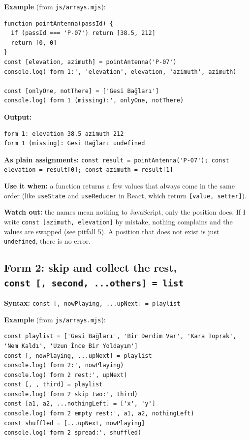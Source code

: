 \textbf{Example} (from \passthrough{\lstinline!js/arrays.mjs!}):

\begin{lstlisting}
function pointAntenna(passId) {
  if (passId === 'P-07') return [38.5, 212]
  return [0, 0]
}
const [elevation, azimuth] = pointAntenna('P-07')
console.log('form 1:', 'elevation', elevation, 'azimuth', azimuth)

const [onlyOne, notThere] = ['Gesi Bağları']
console.log('form 1 (missing):', onlyOne, notThere)
\end{lstlisting}

\textbf{Output:}

\begin{lstlisting}
form 1: elevation 38.5 azimuth 212
form 1 (missing): Gesi Bağları undefined
\end{lstlisting}

\textbf{As plain assignments:} \passthrough{\lstinline!const result = pointAntenna('P-07'); const elevation = result[0]; const azimuth = result[1]!}

\textbf{Use it when:} a function returns a few values that always come in the same order (like \passthrough{\lstinline!useState!} and \passthrough{\lstinline!useReducer!} in React, which return \passthrough{\lstinline![value, setter]!}).

\textbf{Watch out:} the names mean nothing to JavaScript, only the position does. If I write \passthrough{\lstinline!const [azimuth, elevation]!} by mistake, nothing complains and the values are swapped (see pitfall 5). A position that does not exist is just \passthrough{\lstinline!undefined!}, there is no error.

\hypertarget{form-2-skip-and-collect-the-rest-const--second-others--list}{%
\subsection{\texorpdfstring{Form 2: skip and collect the rest, \texttt{const\ {[},\ second,\ ...others{]}\ =\ list}}{Form 2: skip and collect the rest, const {[}, second, ...others{]} = list}}\label{form-2-skip-and-collect-the-rest-const--second-others--list}}

\textbf{Syntax:} \passthrough{\lstinline!const [, nowPlaying, ...upNext] = playlist!}

\textbf{Example} (from \passthrough{\lstinline!js/arrays.mjs!}):

\begin{lstlisting}
const playlist = ['Gesi Bağları', 'Bir Derdim Var', 'Kara Toprak', 'Nem Kaldı', 'Uzun İnce Bir Yoldayım']
const [, nowPlaying, ...upNext] = playlist
console.log('form 2:', nowPlaying)
console.log('form 2 rest:', upNext)
const [, , third] = playlist
console.log('form 2 skip two:', third)
const [a1, a2, ...nothingLeft] = ['x', 'y']
console.log('form 2 empty rest:', a1, a2, nothingLeft)
const shuffled = [...upNext, nowPlaying]
console.log('form 2 spread:', shuffled)
\end{lstlisting}


